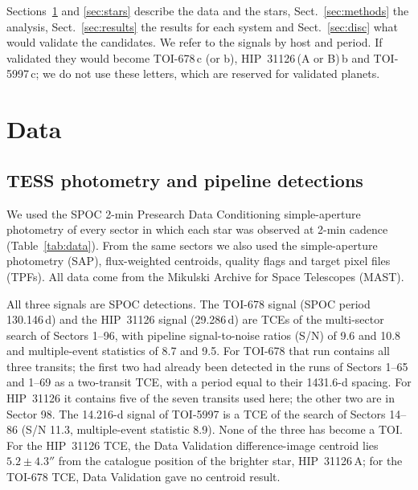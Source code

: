 \documentclass[twocolumn,numberedappendix,appendixfloats]{openjournal}
\begin{document}
Sections~\ref{sec:data} and \ref{sec:stars} describe the data and the stars,
Sect.~\ref{sec:methods} the analysis, Sect.~\ref{sec:results} the results for
each system and Sect.~\ref{sec:disc} what would validate the candidates. We
refer to the signals by host and period. If validated they would become
TOI-678\,c (or b), HIP~31126\,(A or B)\,b and TOI-5997\,c; we do not use these
letters, which are reserved for validated planets.

\section{Data}
\label{sec:data}

\subsection{TESS photometry and pipeline detections}
\label{sec:tess}

We used the SPOC 2-min Presearch Data Conditioning simple-aperture photometry
\citep[PDCSAP;][]{smith2012,stumpe2012} of every sector in which each star was
observed at 2-min cadence (Table~\ref{tab:data}). From the same sectors we
also used the simple-aperture photometry (SAP), flux-weighted centroids,
quality flags and target pixel files (TPFs). All data come from the Mikulski
Archive for Space Telescopes (MAST).

All three signals are SPOC detections. The TOI-678 signal (SPOC period
130.146\,d) and the HIP~31126 signal (29.286\,d) are TCEs of the multi-sector search of Sectors
1--96, with pipeline signal-to-noise ratios (S/N) of 9.6 and 10.8 and
multiple-event statistics of 8.7 and 9.5. For TOI-678 that run contains all
three transits; the first two had already been detected in the runs of
Sectors 1--65 and 1--69 as a two-transit TCE, with a period equal to their
1431.6-d spacing. For HIP~31126 it contains five of the seven transits used here; the
other two are in Sector 98. The 14.216-d signal of TOI-5997 is a TCE of the
search of Sectors 14--86 (S/N 11.3, multiple-event statistic 8.9). None of the
three has become a TOI. For the HIP~31126 TCE, the Data Validation
difference-image centroid lies $5.2 \pm 4.3''$ from the catalogue position of
the brighter star, HIP~31126\,A; for the TOI-678 TCE, Data Validation gave no
centroid result.
\end{document}
